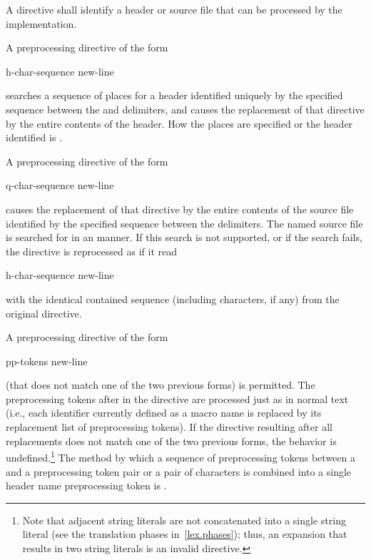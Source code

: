 \pnum
A
directive shall identify a header or source file
that can be processed by the implementation.

\pnum
A preprocessing directive of the form

\begin{ncsimplebnf}
 h-char-sequence \terminal{>} new-line
\end{ncsimplebnf}

searches a sequence of
places
for a header identified uniquely by the specified sequence
between the
\tcode{<}
and
\tcode{>}
delimiters,
and causes the replacement of that
directive by the entire contents of the header.
How the places are specified
or the header identified
is .

\pnum
A preprocessing directive of the form
\begin{ncsimplebnf}
 q-char-sequence  new-line
\end{ncsimplebnf}
causes the replacement of that
directive by the entire contents of the
source file identified by the specified sequence between the
delimiters.
The named source file is searched for in an
manner.
If this search is not supported,
or if the search fails,
the directive is reprocessed as if it read
\begin{ncsimplebnf}
 h-char-sequence \terminal{>} new-line
\end{ncsimplebnf}
with the identical contained sequence (including
\tcode{>}
characters, if any) from the original directive.

\pnum
A preprocessing directive of the form

\begin{ncsimplebnf}
 pp-tokens new-line
\end{ncsimplebnf}

(that does not match one of the two previous forms) is permitted.
The preprocessing tokens after
in the directive are processed just as in normal text
(i.e., each identifier currently defined as a macro name is replaced by its
replacement list of preprocessing tokens).
If the directive resulting after all replacements does not match
one of the two previous forms, the behavior is
undefined.\footnote{Note that adjacent string literals are not concatenated into
a single string literal
(see the translation phases in~\ref{lex.phases});
thus, an expansion that results in two string literals is an
invalid directive.}
The method by which a sequence of preprocessing tokens between a
\tcode{<}
and a
\tcode{>}
preprocessing token pair or a pair of
characters is combined into a single header name
preprocessing token is .

